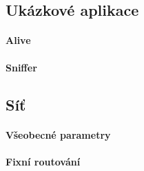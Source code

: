 \documentclass[12pt,titlepage]{article}
\begin{document}
	\subsection{Ukázkové aplikace}
		\paragraph{Alive}
		\paragraph{Sniffer}
	 
	\subsection{Síť}
		\paragraph{Všeobecné parametry}
		\paragraph{Fixní routování}
	
\end{document}
